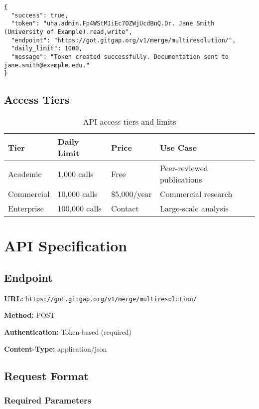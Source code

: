 \documentclass[11pt]{article}
\begin{document}
\begin{lstlisting}[style=json, caption={Token response}]
{
  "success": true,
  "token": "uha.admin.Fp4WStMJiEc7OZWjUcdBnQ.Dr. Jane Smith (University of Example).read,write",
  "endpoint": "https://got.gitgap.org/v1/merge/multiresolution/",
  "daily_limit": 1000,
  "message": "Token created successfully. Documentation sent to jane.smith@example.edu."
}
\end{lstlisting}

\subsection{Access Tiers}

\begin{table}[h]
\centering
\begin{tabular}{@{}llll@{}}
\toprule
\textbf{Tier} & \textbf{Daily Limit} & \textbf{Price} & \textbf{Use Case} \\ \midrule
Academic & 1,000 calls & Free & Peer-reviewed publications \\
Commercial & 10,000 calls & \$5,000/year & Commercial research \\
Enterprise & 100,000 calls & Contact & Large-scale analysis \\ \bottomrule
\end{tabular}
\caption{API access tiers and limits}
\label{tab:tiers}
\end{table}

\section{API Specification}

\subsection{Endpoint}

\textbf{URL:} \texttt{https://got.gitgap.org/v1/merge/multiresolution/}

\textbf{Method:} POST

\textbf{Authentication:} Token-based (required)

\textbf{Content-Type:} application/json

\subsection{Request Format}

\subsubsection{Required Parameters}
\end{document}
